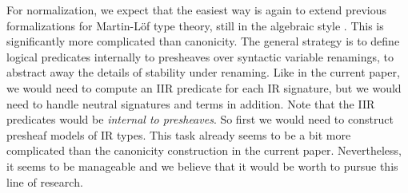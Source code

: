 \documentclass[acmsmall,screen,review]{acmart}
\begin{document}
For normalization, we expect that the easiest way is again to extend previous formalizations for
Martin-Löf type theory, still in the algebraic style
\cite{DBLP:journals/lmcs/AltenkirchK17,coquand2018canonicity,sterlingthesis,DBLP:conf/fscd/BocquetKS23}. This
is significantly more complicated than canonicity. The general strategy is to define logical
predicates internally to presheaves over syntactic variable renamings, to abstract away the details
of stability under renaming. Like in the current paper, we would need to compute an IIR predicate
for each IR signature, but we would need to handle neutral signatures and terms in addition. Note
that the IIR predicates would be \emph{internal to presheaves}. So first we would need to
construct presheaf models of IR types. This task already seems to be a bit more complicated than the
canonicity construction in the current paper. Nevertheless, it seems to be manageable and we believe
that it would be worth to pursue this line of research.



\end{document}
